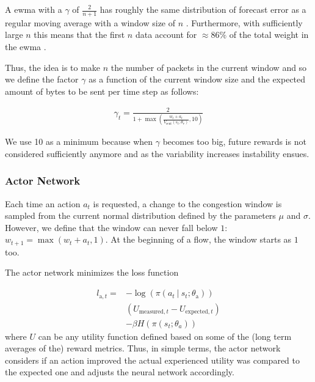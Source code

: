 \documentclass[sigconf]{acmart}
\newcommand\givenbase[1][]{\:#1\lvert\:}
\let\given\givenbase
\begin{document}
A ewma with a $\gamma$ of $\frac{2}{n+1}$ has roughly the same distribution of forecast error as a regular moving average with a window size of $n$ \cite{nahmias_production_2009}. Furthermore, with sufficiently large $n$ this means that the first $n$ data account for $\approx 86\%$ of the total weight in the ewma \cite{boissard_applications_2012}.

Thus, the idea is to make $n$ the number of packets in the current window and so we define the factor $\gamma$ as a function of the current window size and the expected amount of bytes to be sent per time step as follows:

\begin{align*}
\gamma_t = \frac{2}{1+\max(\frac{w_t+a_t}{V_\text{sent}(s_t; \theta_\text{v})},10)}
\end{align*}

We use 10 as a minimum because when $\gamma$ becomes too big, future rewards is not considered sufficiently anymore and as the variability increases instability ensues. 

\subsubsection{Actor Network}
\label{subsubsec:actor}

Each time an action $a_t$ is requested, a change to the congestion window is sampled from the current normal distribution defined by the parameters $\mu$ and $\sigma$. However, we define that the window can never fall below $1$: $w_{t+1} = \max(w_t + a_t, 1)$. At the beginning of a flow, the window starts as $1$ too.  

The actor network minimizes the loss function

\begin{align*}
l_{\text{a},t} =& -\log \left( \pi \left( a_t \given s_t ; \theta_\text{a} \right) \right)\\
& \left( U_{\text{measured},t} - U_{\text{expected},t} \right)\\ 
&- \beta H\left( \pi\left( s_t; \theta_a \right)\right)
\end{align*}
where $U$ can be any utility function defined based on some of the (long term averages of the) reward metrics. Thus, in simple terms, the actor network considers if an action improved the actual experienced utility was compared to the expected one and adjusts the neural network accordingly.
 
\end{document}
